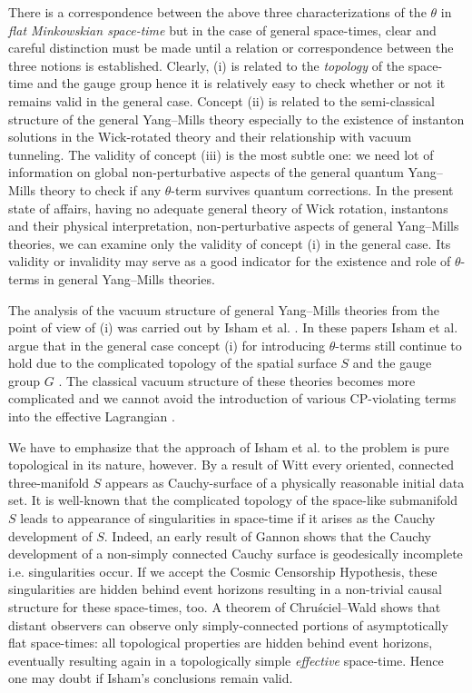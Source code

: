 \documentclass[a4paper,12pt,draft]{article}
\begin{document}
There is a correspondence between the above three characterizations of the
$\theta$ in {\it flat Min\-kow\-ski\-an space-time} but in the case of
general space-times, clear and careful distinction must be made until a
relation or correspondence between the three notions is established.
Clearly, (i) is related to the {\it topology} of the space-time and
the gauge group hence it is relatively easy to check whether or not it
remains valid in the general case. Concept (ii) is related to the
semi-classical structure of the
general Yang--Mills theory especially to the existence of instanton
solutions in the Wick-rotated theory and their relationship with vacuum
tunneling. The validity of concept (iii) is the most subtle one: we need
lot of information on global non-perturbative aspects of the general
quantum Yang--Mills theory to check if any $\theta$-term survives quantum
corrections. In the present state of affairs, having no adequate general
theory of Wick rotation, instantons and their physical interpretation,
non-perturbative aspects of general Yang--Mills theories, we can examine
only the validity of concept (i) in the general case. Its validity or
invalidity may serve as a good indicator for the existence and role of
$\theta$-terms in general Yang--Mills theories.

The analysis of the vacuum structure of general Yang--Mills
theories from the point of view of (i) was carried out by Isham et al.
\cite{isham1}\cite{isham2}\cite{isham3}\cite{isham4}\cite{isham5}. In
these papers Isham et al. argue that in the general case concept (i) for
introducing $\theta$-terms still continue to hold due to the complicated
topology of the spatial surface $S$ and the gauge group $G$ \cite{isham1}.
The classical vacuum structure of these theories becomes more complicated
and we cannot avoid the introduction of various CP-violating terms into
the effective Lagrangian \cite{isham5}. 

We have to emphasize that the approach of Isham et al. to the problem is
pure topological in its nature, however. By a result of Witt \cite{wit}
every oriented, connected three-manifold $S$ appears as Cauchy-surface
of a physically reasonable initial data set. It is well-known
that the complicated topology of the space-like submanifold $S$ leads to
appearance of singularities in space-time if it arises as the
Cauchy development of $S$. Indeed, an early result of Gannon \cite{gan}
shows that the Cauchy development of a non-simply connected Cauchy surface
is geodesically incomplete i.e. singularities occur. If we accept the
Cosmic Censorship Hypothesis, these singularities are hidden behind event
horizons resulting in a non-trivial causal structure for these
space-times, too. A theorem of Chru\'sciel--Wald \cite{chr-wal} shows that
distant observers can observe only simply-connected portions of 
asymptotically flat space-times: all topological properties are hidden
behind event horizons, eventually resulting again in a topologically
simple {\it effective} space-time. Hence one may doubt if Isham's
conclusions remain valid.
\end{document}
